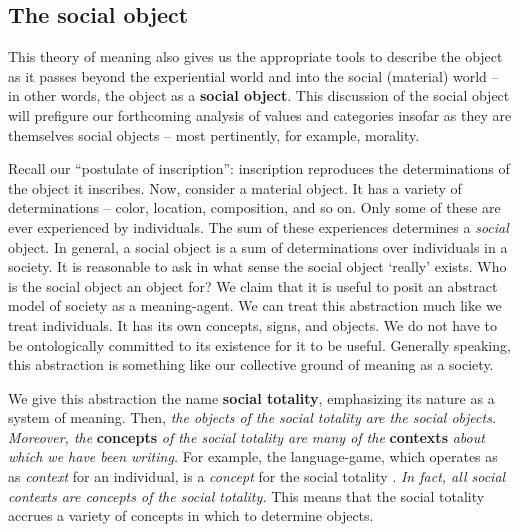 \subsection{The social object}\label{sec:theory:social}
This theory of meaning also gives us the appropriate tools to describe the object as it passes beyond the experiential world and into the social (material) world -- in other words, the object as a \textbf{social object}. This discussion of the social object will prefigure our forthcoming analysis of values and categories insofar as they are themselves social objects -- most pertinently, for example, morality.

Recall our ``postulate of inscription'': inscription reproduces the determinations of the object it inscribes.
Now, consider a material object. It has a variety of determinations -- color, location, composition, and so on. Only some of these are ever experienced by individuals. The sum of these experiences determines a \textit{social} object. In general, a social object is a sum of determinations over individuals in a society. It is reasonable to ask in what sense the social object `really' exists. Who is the social object an object for? We claim that it is useful to posit an abstract model of society as a meaning-agent. We can treat this abstraction much like we treat individuals. It has its own concepts, signs, and objects. We do not have to be ontologically committed to its existence for it to be useful. Generally speaking, this abstraction is something like our collective ground of meaning as a society.

We give this abstraction the name \textbf{social totality}, emphasizing its nature as a system of meaning. Then, \textit{the objects of the social totality are the social objects.} \textit{Moreover, the }\textbf{concepts}\textit{ of the social totality are many of the }\textbf{contexts}\textit{ about which we have been writing.} For example, the language-game, which operates as as \textit{context} for an individual, is a \textit{concept} for the social totality \citep{Gadamer:TruthAndMethod, Heidegger:BeingAndTime}. \textit{In fact, all social contexts are concepts of the social totality.} This means that the social totality accrues a variety of concepts in which to determine objects.

